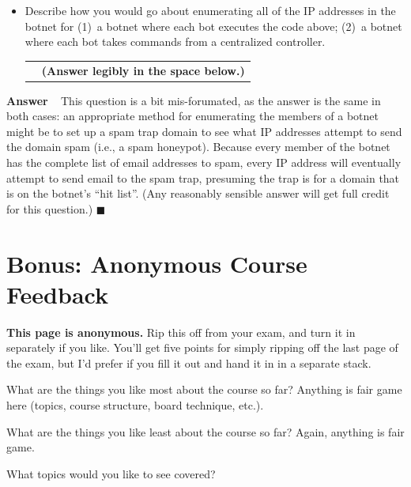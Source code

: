 \documentclass[11pt]{article}
\newcounter{pctr}
\newcommand{\ansbelow}{\probnote{Answer legibly in the space below.}}
\newcommand{\sols}[1]{#1}
\newcommand{\sols}[1]{}
\newcounter{answer}
\newenvironment{answer}[1][\relax]{\refstepcounter{answer}\begin{list}%
 {}{\leftmargin 0pt\rightmargin 0pt\labelsep 3pt\parsep 0pt%
 \setlength{\listparindent}{\parindent}}
    \item {\bf Answer \theanswer #1}\
    }{\hspace*{\fill}$\blacksquare$\end{list}}
\newcommand\prob[1]%
  {\begin{itemize}\item[]%
   \vspace{.2in}{\bf\thepctr. ~[#1~ points]:}\stepcounter{pctr}}
\newcommand\eprob{\end{itemize}}
\newcommand\probnote[1]%
  {\\\begin{tabular}{cr} \hspace{3in} & {\bf (#1)} \\ \end{tabular}}
\begin{document}
\prob{6}
Describe how you would go about enumerating all of the IP
addresses in the botnet for (1)~a botnet where each bot executes the
code above; (2)~a botnet where each bot takes commands from a
centralized controller. 
\ansbelow
\eprob
\sols{
\begin{answer}
This question is a bit mis-forumated, as the answer is the same in both
cases: an appropriate method for enumerating the members of a botnet
might be to set up a spam trap domain to see what IP addresses attempt
to send the domain spam (i.e., a spam honeypot).  Because every member
of the botnet has the complete list of email addresses to spam, every IP
address will eventually attempt to send email to the spam trap,
presuming the trap is for a domain that is on the botnet's ``hit list''.
(Any reasonably sensible answer will get full credit for this question.)
\end{answer}
}


\newpage
\section{Bonus: Anonymous Course Feedback}

{\bf This page is anonymous.}  Rip this off from your exam, and turn it
in separately if you like.  You'll get five points for simply ripping
off the last page of the exam, but I'd prefer if you fill it out and
hand it in in a separate stack.
\vspace{.5in}

What are the things you like most about the course so far?  Anything is
fair game here (topics, course structure, board technique, etc.).
\vspace{1.5in}


What are the things you like least about the course so far?  Again,
anything is fair game.
\vspace{1in}


What topics would you like to see covered?
\vspace{1in}



\label{lastpage}
\end{document}
